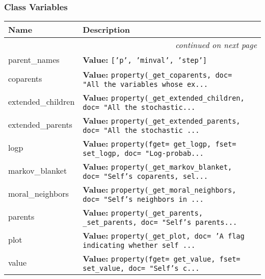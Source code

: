 
  \subsubsection{Class Variables}

\begin{longtable}{|p{}|p{}|l}
\cline{1-2}
\cline{1-2} \centering \textbf{Name} & \centering \textbf{Description}& \\
\cline{1-2}
\endhead\cline{1-2}\multicolumn{3}{r}{\small\textit{continued on next page}}\\\endfoot\cline{1-2}
\endlastfoot\raggedright p\-a\-r\-e\-n\-t\-\_\-n\-a\-m\-e\-s\- & \raggedright \textbf{Value:} 
{\tt ['p', 'minval', 'step']}&\\
\cline{1-2}
\raggedright c\-o\-p\-a\-r\-e\-n\-t\-s\- & \raggedright \textbf{Value:} 
{\tt property(\_get\_coparents, doc= "All the variables whose ex\texttt{...}}&\\
\cline{1-2}
\raggedright e\-x\-t\-e\-n\-d\-e\-d\-\_\-c\-h\-i\-l\-d\-r\-e\-n\- & \raggedright \textbf{Value:} 
{\tt property(\_get\_extended\_children, doc= "All the stochastic\texttt{...}}&\\
\cline{1-2}
\raggedright e\-x\-t\-e\-n\-d\-e\-d\-\_\-p\-a\-r\-e\-n\-t\-s\- & \raggedright \textbf{Value:} 
{\tt property(\_get\_extended\_parents, doc= "All the stochastic \texttt{...}}&\\
\cline{1-2}
\raggedright l\-o\-g\-p\- & \raggedright \textbf{Value:} 
{\tt property(fget= get\_logp, fset= set\_logp, doc= "Log-probab\texttt{...}}&\\
\cline{1-2}
\raggedright m\-a\-r\-k\-o\-v\-\_\-b\-l\-a\-n\-k\-e\-t\- & \raggedright \textbf{Value:} 
{\tt property(\_get\_markov\_blanket, doc= "Self's coparents, sel\texttt{...}}&\\
\cline{1-2}
\raggedright m\-o\-r\-a\-l\-\_\-n\-e\-i\-g\-h\-b\-o\-r\-s\- & \raggedright \textbf{Value:} 
{\tt property(\_get\_moral\_neighbors, doc= "Self's neighbors in \texttt{...}}&\\
\cline{1-2}
\raggedright p\-a\-r\-e\-n\-t\-s\- & \raggedright \textbf{Value:} 
{\tt property(\_get\_parents, \_set\_parents, doc= "Self's parents\texttt{...}}&\\
\cline{1-2}
\raggedright p\-l\-o\-t\- & \raggedright \textbf{Value:} 
{\tt property(\_get\_plot, doc= 'A flag indicating whether self \texttt{...}}&\\
\cline{1-2}
\raggedright v\-a\-l\-u\-e\- & \raggedright \textbf{Value:} 
{\tt property(fget= get\_value, fset= set\_value, doc= "Self's c\texttt{...}}&\\
\cline{1-2}
\end{longtable}

